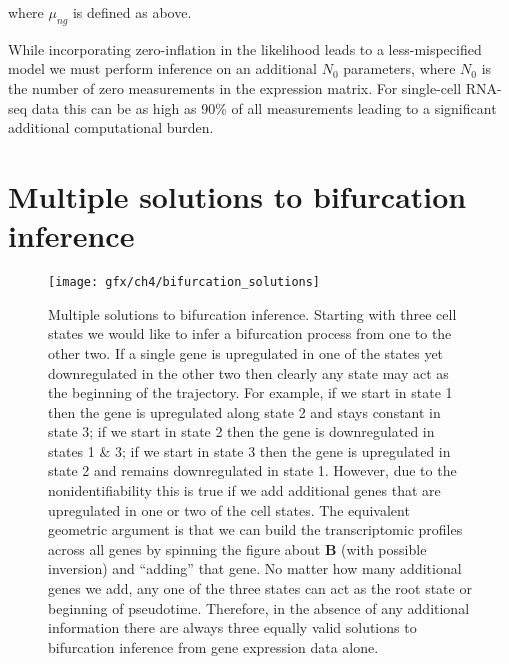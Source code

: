 where $\mu_{ng}$ is defined as above.



While incorporating zero-inflation in the likelihood leads to a less-mispecified model we must perform inference on an additional $N_0$ parameters, where $N_0$ is the number of zero measurements in the expression matrix. For single-cell RNA-seq data this can be as high as 90\% of all measurements leading to a significant additional computational burden.



\section{Multiple solutions to bifurcation inference}

\begin{figure}%
	\centering
	\texttt{[image: gfx/ch4/bifurcation\_solutions]}
	\caption[Multiple solutions to bifurcation inference.]{Multiple solutions to bifurcation inference.
{\normalfont
Starting with three cell states we would like to infer a bifurcation process from one to the other two. If a single gene is upregulated in one of the states yet downregulated in the other two then clearly any state may act as the beginning of the trajectory. For example, if we start in state 1 then the gene is upregulated along state 2 and stays constant in state 3; if we start in state 2 then the gene is downregulated in states 1 \& 3; if we start in state 3 then the gene is upregulated in state 2 and remains downregulated in state 1.  However, due to the nonidentifiability this is true if we add additional genes that are upregulated in one or two of the cell states. The equivalent geometric argument is that we can build the transcriptomic profiles across all genes by spinning the figure about \textbf{B} (with possible inversion) and ``adding'' that gene. No matter how many additional genes we add, any one of the three states can act as the root state or beginning of pseudotime. Therefore, in the absence of any additional information there are always three equally valid solutions to bifurcation inference from gene expression data alone.
}
	} \label{fig:multisol}
\end{figure}

